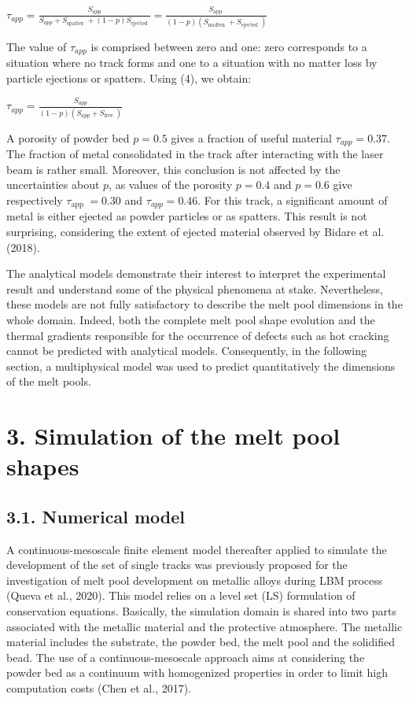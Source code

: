 \documentclass[10pt]{article}
\begin{document}
$\tau_{a p p}=\frac{S_{a p p}}{S_{a p p}+S_{\text {spatter }}+(1-p) S_{\text {ejected }}}=\frac{S_{\text {app }}}{(1-p)\left(S_{\text {molten }}+S_{\text {ejected }}\right)}$

The value of $\tau_{a p p}$ is comprised between zero and one: zero corresponds to a situation where no track forms and one to a situation with no matter loss by particle ejections or spatters. Using (4), we obtain:

$\tau_{a p p}=\frac{S_{a p p}}{(1-p)\left(S_{a p p}+S_{\text {free }}\right)}$

A porosity of powder bed $p=0.5$ gives a fraction of useful material $\tau_{a p p}=0.37$. The fraction of metal consolidated in the track after interacting with the laser beam is rather small. Moreover, this conclusion is not affected by the uncertainties about $p$, as values of the porosity $p=0.4$ and $p=0.6$ give respectively $\tau_{\text {app }}=0.30$ and $\tau_{a p p}=0.46$. For this track, a significant amount of metal is either ejected as powder particles or as spatters. This result is not surprising, considering the extent of ejected material observed by Bidare et al. (2018).

The analytical models demonstrate their interest to interpret the experimental result and understand some of the physical phenomena at stake. Nevertheless, these models are not fully satisfactory to describe the melt pool dimensions in the whole domain. Indeed, both the complete melt pool shape evolution and the thermal gradients responsible for the occurrence of defects such as hot cracking cannot be predicted with analytical models. Consequently, in the following section, a multiphysical model was used to predict quantitatively the dimensions of the melt pools.

\section*{3. Simulation of the melt pool shapes}
\subsection*{3.1. Numerical model}
A continuous-mesoscale finite element model thereafter applied to simulate the development of the set of single tracks was previously proposed for the investigation of melt pool development on metallic alloys during LBM process (Queva et al., 2020). This model relies on a level set (LS) formulation of conservation equations. Basically, the simulation domain is shared into two parts associated with the metallic material and the protective atmosphere. The metallic material includes the substrate, the powder bed, the melt pool and the solidified bead. The use of a continuous-mesoscale approach aims at considering the powder bed as a continuum with homogenized properties in order to limit high computation costs (Chen et al., 2017).
\end{document}

